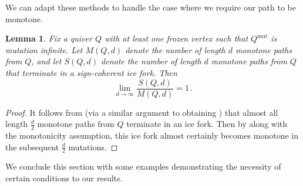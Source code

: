 \documentclass[12pt]{amsart}
\def\AB#1{(\textcolor{blue}{#1})}
\newcommand{\cS}[1]{{\noindent\textsf{\color{purple}$\blacksquare$~#1~$\blacksquare$}}}
\newtheorem{cor}[thm]{Corollary}
\newtheorem{lem}[thm]{Lemma}
\theoremstyle{definition}
\theoremstyle{remark}
\numberwithin{equation}{section}
\newcommand{\mut} {\text{mut}}
\begin{document}
We can adapt these methods to handle the case where we require our path to be monotone.  

\begin{lem}
Fix a quiver $Q$ with at least one frozen vertex such that $Q^{\mut}$ is mutation infinite.  Let $M(Q,d)$ denote the number of length $d$ monotone paths from $Q$, and let $S(Q,d)$ denote the number of length $d$ monotone paths from $Q$ that terminate in a sign-coherent ice fork.  Then
$$\lim_{d \to \infty} \frac{S(Q,d)}{M(Q,d)} = 1\,.$$
\end{lem}
\begin{proof}
    It follows from  (via a similar argument to obtaining ) that almost all length $\frac{d}{2}$ monotone paths from $Q$ terminate in an ice fork.  Then by  along with the monotonicity assumption, this ice fork almost certainly becomes monotone in the subsequent $\frac{d}{2}$ mutations. %
\end{proof}








We conclude this section with some examples demonstrating the necessity of certain conditions to our results. 
\end{document}
